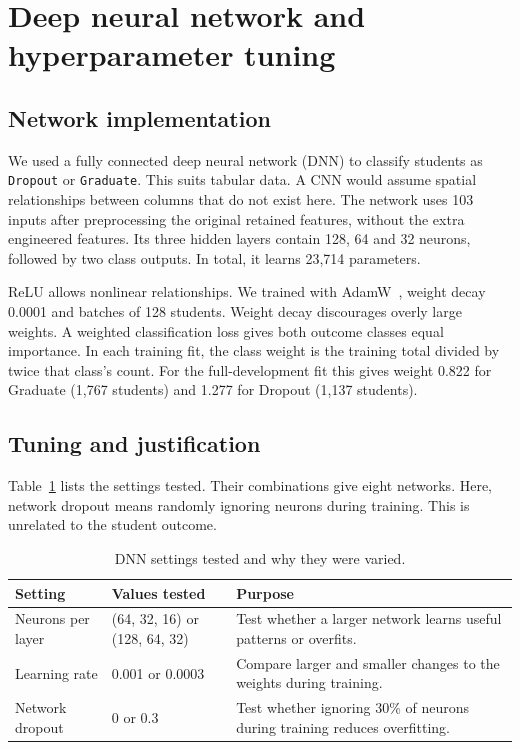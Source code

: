 \section{Deep neural network and hyperparameter tuning}
\label{sec:deep-network}

\subsection{Network implementation}
We used a fully connected deep neural network (DNN) to classify students as
\texttt{Dropout} or \texttt{Graduate}. This suits tabular data. A CNN would assume
spatial relationships between columns that do not exist here. The network uses
103 inputs after preprocessing the original retained features, without the
extra engineered features. Its three hidden layers contain 128, 64 and 32
neurons, followed by two class outputs. In total, it learns 23,714 parameters.

ReLU allows nonlinear relationships. We trained with AdamW~\cite{loshchilov2019adamw},
weight decay 0.0001 and batches of 128 students. Weight decay discourages overly
large weights. A weighted classification loss gives both outcome classes equal importance.
In each training fit, the class weight is the training total divided by twice
that class's count. For the full-development fit this gives weight 0.822 for
Graduate (1,767 students) and 1.277 for Dropout (1,137 students).

\subsection{Tuning and justification}
Table~\ref{tab:dnn-search} lists the settings tested. Their combinations give
eight networks. Here, network dropout means randomly ignoring neurons during
training. This is unrelated to the student outcome.

\begin{table}[H]
\centering
\small
\caption[DNN tuning grid]{DNN settings tested and why they were varied.}
\label{tab:dnn-search}
\begin{tabularx}{\linewidth}{@{}l l X@{}}
\toprule
Setting & Values tested & Purpose \\
\midrule
Neurons per layer & (64, 32, 16) or (128, 64, 32) & Test whether a larger network learns useful patterns or overfits. \\
Learning rate & 0.001 or 0.0003 & Compare larger and smaller changes to the weights during training. \\
Network dropout & 0 or 0.3 & Test whether ignoring 30\% of neurons during training reduces overfitting. \\
\bottomrule
\end{tabularx}
\end{table}

